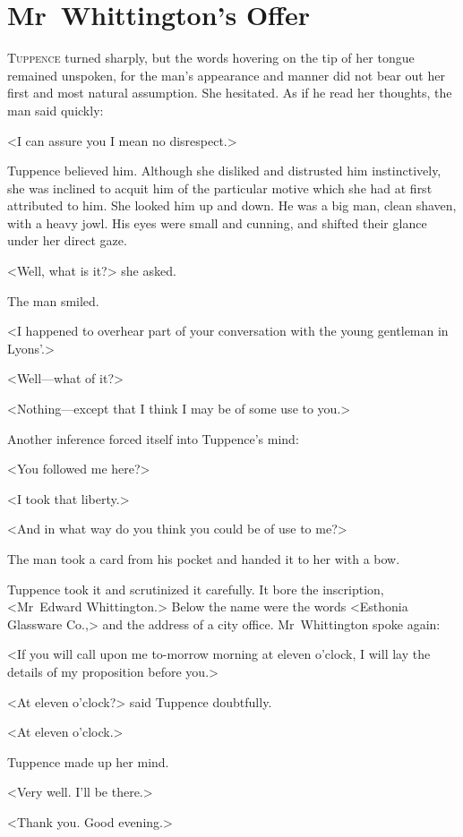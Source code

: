 \chapter{Mr~Whittington's Offer} 

 \lettrine{T}{uppence} turned sharply, but the words hovering on the tip of her tongue remained unspoken, for the man's appearance and manner did not bear out her first and most natural assumption. She hesitated. As if he read her thoughts, the man said quickly:

<I can assure you I mean no disrespect.>

Tuppence believed him. Although she disliked and distrusted him instinctively, she was inclined to acquit him of the particular motive which she had at first attributed to him. She looked him up and down. He was a big man, clean shaven, with a heavy jowl. His eyes were small and cunning, and shifted their glance under her direct gaze.

<Well, what is it?> she asked.

The man smiled.

<I happened to overhear part of your conversation with the young gentleman in Lyons'.>

<Well—what of it?>

<Nothing—except that I think I may be of some use to you.>

Another inference forced itself into Tuppence's mind:

<You followed me here?>

<I took that liberty.>

<And in what way do you think you could be of use to me?>

The man took a card from his pocket and handed it to her with a bow.

Tuppence took it and scrutinized it carefully. It bore the inscription, <Mr~Edward Whittington.> Below the name were the words <Esthonia Glassware Co.,> and the address of a city office. Mr~Whittington spoke again:

<If you will call upon me to-morrow morning at eleven o'clock, I will lay the details of my proposition before you.>

<At eleven o'clock?> said Tuppence doubtfully.

<At eleven o'clock.>

Tuppence made up her mind.

<Very well. I'll be there.>

<Thank you. Good evening.>

